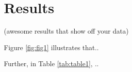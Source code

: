 \section{Results}

(awesome results that show off your data)


Figure \ref{fig:fig1} illustrates that..


Further, in Table \ref{tab:table1}, ..